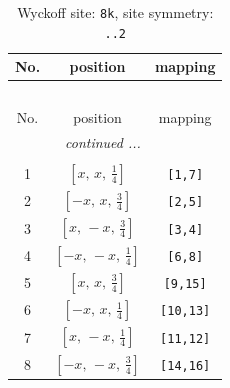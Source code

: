 \documentclass[fleqn,8pt]{jsarticle}
\begin{document}
\begin{longtable}{ccc}
\caption{Wyckoff site: {\tt 8k}, site symmetry: {\tt ..2}}
 \\
 \hline \hline
No. & position & mapping \\ \hline \endfirsthead

\multicolumn{2}{l}{\tablename\ \thetable{}} \\
 \hline \hline
No. & position & mapping \\ \hline \endhead

 \hline \hline
\multicolumn{2}{r}{\footnotesize\it continued ...} \\ \endfoot

 \hline \hline
\multicolumn{2}{r}{} \\ \endlastfoot

1 & $\left[ x,\, x,\, \frac{1}{4} \right]$ & {\tt [1,7]} \\ \hline
2 & $\left[ - x,\, x,\, \frac{3}{4} \right]$ & {\tt [2,5]} \\ \hline
3 & $\left[ x,\, - x,\, \frac{3}{4} \right]$ & {\tt [3,4]} \\ \hline
4 & $\left[ - x,\, - x,\, \frac{1}{4} \right]$ & {\tt [6,8]} \\ \hline
5 & $\left[ x,\, x,\, \frac{3}{4} \right]$ & {\tt [9,15]} \\ \hline
6 & $\left[ - x,\, x,\, \frac{1}{4} \right]$ & {\tt [10,13]} \\ \hline
7 & $\left[ x,\, - x,\, \frac{1}{4} \right]$ & {\tt [11,12]} \\ \hline
8 & $\left[ - x,\, - x,\, \frac{3}{4} \right]$ & {\tt [14,16]} \\
\end{longtable}
\renewcommand{\arraystretch}{1.2}
\end{document}
